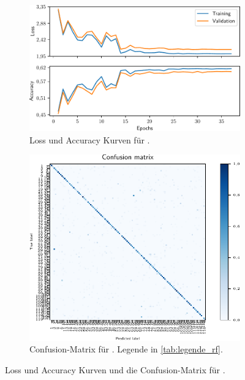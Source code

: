 \begin{figure}
  \begin{subfigure}{0.49\textwidth}
    \centering
    \includegraphics[width=\textwidth]{pics/ergebnisse/PreBigDogNN/history_epoch.pdf}
    \caption{Loss und Accuracy Kurven für \PreBig{}.}
    \label{fig:loss-acc-prebig}
  \end{subfigure}
  \qquad
  \begin{subfigure}{0.49\textwidth}
    \centering
    \includegraphics[width=\textwidth]{pics/ergebnisse/PreBigDogNN/confusion_matrix_numbers.pdf}
    \caption{Confusion-Matrix für \PreBig{}. Legende in \autoref{tab:legende_rf}.}
    \label{fig:confusion-prebig}
  \end{subfigure}
  \caption{Loss und Accuracy Kurven und die Confusion-Matrix für \PreBig{}.}
  \label{fig:plots-prebig}
\end{figure}

